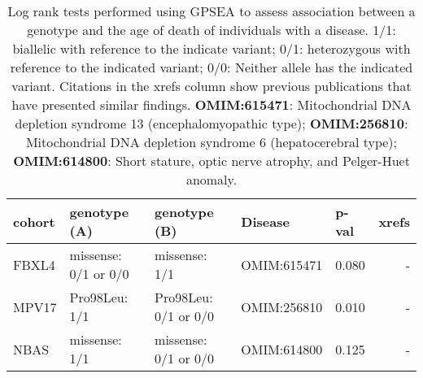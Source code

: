 \documentclass[12pt]{article}
\begin{document}
\clearpage
\newpage


\begin{table}
\centering
\begin{tabular}{lp{3.5cm}p{3.5cm}>{\raggedright}p{3cm}lr}
\toprule
\textbf{cohort} & \textbf{genotype (A)} & \textbf{genotype (B)} & \textbf{Disease} & \textbf{p-val} & \textbf{xrefs}\\
\midrule
FBXL4 & missense: 0/1 or 0/0 & missense: 1/1 & OMIM:615471 & 0.080 & -\\
MPV17 & Pro98Leu: 1/1 & Pro98Leu: 0/1 or 0/0 & OMIM:256810 & 0.010 & -\\
NBAS & missense: 1/1 & missense: 0/1 or 0/0 & OMIM:614800 & 0.125 & -\\
\bottomrule
\end{tabular}
\caption{Log rank tests performed using GPSEA to assess association between a genotype and the age of
    death of individuals with a disease. 1/1: biallelic with reference to the indicate variant; 
    0/1: heterozygous with reference to the indicated variant; 0/0: Neither allele has the indicated variant.
    Citations in the xrefs column show previous publications that have presented similar findings.
    \textbf{OMIM:615471}: Mitochondrial DNA depletion syndrome 13 (encephalomyopathic type);
	\textbf{OMIM:256810}: Mitochondrial DNA depletion syndrome 6 (hepatocerebral type);
	\textbf{OMIM:614800}: Short stature, optic nerve atrophy, and Pelger-Huet anomaly.
    }
\label{tab:mortality}
\end{table}
\clearpage
\newpage
\end{document}
